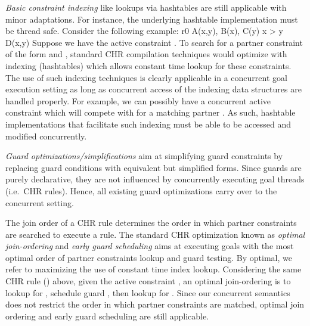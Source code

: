 \documentclass{tlp}
\begin{document}
{\em Basic constraint indexing} like lookups via hashtables are still applicable with minor adaptations. For 
instance, the underlying hashtable implementation must be thread safe. Consider the following example:
  r0 \atsign A(x,y), B(x), C(y) \simparrow x > y \mid D(x,y)
\eda
Suppose we have the active constraint . To search for a
partner constraint of the form  and , standard CHR compilation techniques would 
optimize with indexing (hashtables) which allows constant time lookup for these constraints. 
The use of such indexing techniques is clearly applicable in a concurrent goal execution setting 
as long as concurrent access of the indexing data structures are handled properly. For example,
we can possibly have a concurrent active constraint  which will compete with  
for a matching partner . As such, hashtable implementations that facilitate such indexing 
must be able to be accessed and modified concurrently. 

{\em Guard optimizations/simplifications} aim at simplifying guard constraints by replacing
guard conditions with equivalent but simplified forms. Since guards are purely declarative, 
they are not influenced by concurrently executing goal threads (i.e.~CHR rules). Hence, all existing 
guard optimizations carry over to the concurrent setting.


The join order of a CHR rule determines the order in which partner constraints are searched
to execute a rule. The standard CHR optimization known as {\em optimal join-ordering} and 
{\em early guard scheduling} \cite{greg:thesis} aims at executing goals with the most optimal order of 
partner constraints lookup and guard testing. By optimal, we refer to maximizing the use of 
constant time index lookup. Considering the same CHR rule () above, given the 
active constraint , an optimal join-ordering is to lookup for , schedule guard 
, then lookup for . Since our concurrent semantics does not restrict the order 
in which partner constraints are matched, optimal join ordering and early guard scheduling are still
applicable.
 
\end{document}

